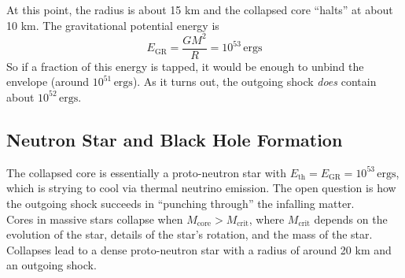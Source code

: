 \documentclass[10pt]{article}
\numberwithin{equation}{section}
\newcommand{\n}{\noindent}
\begin{document}
	\n At this point, the radius is about 15 km and the collapsed core ``halts'' at about 10 km. The gravitational potential energy is
	\begin{equation}
	E_{\mathrm{GR}}=\frac{GM^{2}}{R}=10^{53}\,\mathrm{ergs}
	\end{equation}
	So if a fraction of this energy is tapped, it would be enough to unbind the envelope (around $10^{51}\,\mathrm{ergs}$). As it turns out, the outgoing shock \emph{does} contain about $10^{52}\,\mathrm{ergs}$.
	
	\subsection{Neutron Star and Black Hole Formation}
	\label{sec:neutron-star} 
	The collapsed core is essentially a proto-neutron star with $E_{\mathrm{th}}=E_{\mathrm{GR}}=10^{53}\,\mathrm{ergs}$, which is strying to cool via thermal neutrino emission. The open question is how the outgoing shock succeeds in ``punching through'' the infalling matter.\\
	
	\n Cores in massive stars collapse when $M_{\mathrm{core}}>M_{\mathrm{crit}}$, where $M_{\mathrm{crit}}$ depends on the evolution of the star, details of the star's rotation, and the mass of the star. Collapses lead to a dense proto-neutron star with a radius of around 20 km and an outgoing shock.
	
\end{document}
